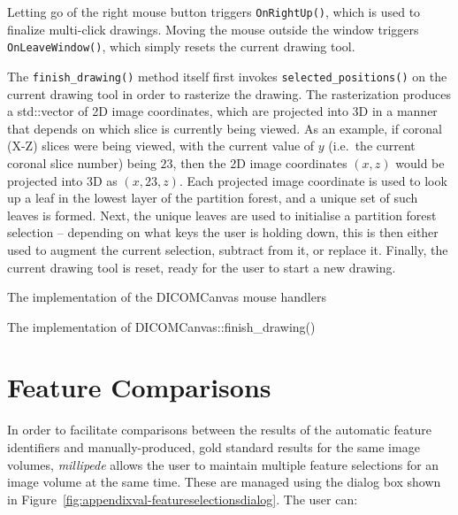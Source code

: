 Letting go of the right mouse button triggers \texttt{OnRightUp()}, which is used to finalize multi-click drawings. Moving the mouse outside the window triggers \texttt{OnLeaveWindow()}, which simply resets the current drawing tool.

The \texttt{finish_drawing()} method itself first invokes \texttt{selected_positions()} on the current drawing tool in order to rasterize the drawing. The rasterization produces a std::vector of 2D image coordinates, which are projected into 3D in a manner that depends on which slice is currently being viewed. As an example, if coronal (X-Z) slices were being viewed, with the current value of $y$ (i.e.~the current coronal slice number) being $23$, then the 2D image coordinates $(x,z)$ would be projected into 3D as $(x,23,z)$. Each projected image coordinate is used to look up a leaf in the lowest layer of the partition forest, and a unique set of such leaves is formed. Next, the unique leaves are used to initialise a partition forest selection -- depending on what keys the user is holding down, this is then either used to augment the current selection, subtract from it, or replace it. Finally, the current drawing tool is reset, ready for the user to start a new drawing.

\begin{stulisting}[p]
\caption{The implementation of the DICOMCanvas mouse handlers}
\label{code:appendixval-mousehandlers}

\end{stulisting}

\begin{stulisting}[p]
\caption{The implementation of DICOMCanvas::finish_drawing()}
\label{code:appendixval-finishdrawing}

\end{stulisting}

\newpage

\section{Feature Comparisons}
\label{sec:appendixval-featurecomparisons}

In order to facilitate comparisons between the results of the automatic feature identifiers and manually-produced, gold standard results for the same image volumes, \emph{millipede} allows the user to maintain multiple feature selections for an image volume at the same time. These are managed using the dialog box shown in Figure~\ref{fig:appendixval-featureselectionsdialog}. The user can:

